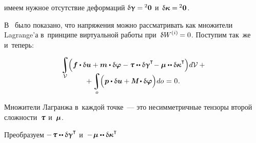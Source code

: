 \begin{otherlanguage}{russian}
\vspace{-0.56em} \noindent имеем нужное отсутствие деформаций
${\updelta\hspace{-0.1ex}\bm{\upgamma} = \hspace{-0.1ex} {^2\bm{0}}}$ и~${\updelta\hspace{-0.1ex}\bm{\kappa}\hspace{-0.1ex} = \hspace{-0.1ex} {^2\bm{0}}}$.

В~ было показано, что напряжения можно рассматривать как множители Lagrange’а в~принципе виртуальной работы при~${\variation{\internalwork} = 0}$. Поступим так~же и~теперь:

\nopagebreak\vspace{-0.33em}
\begin{multline}\label{virtualworkprinciple.1:micropolarcontinuum}
\integral\displaylimits_{\mathcal{V}} \hspace{-0.64ex} \left(^{\mathstrut} \bm{f} \dotp \variation{\fieldofdisplacements}
+ \bm{m} \dotp \variation{\fieldofrotations}
- \forcestresstensor \dotdotp \variation{\distortiontensor}^{\T} \hspace{-0.4ex}
- \couplestresstensor \dotdotp \variation{\wrynesstensor}^{\T} \hspace{-0.05ex} \right) \hspace{-0.32ex} d\mathcal{V} \hspace{.5ex} + \\[-1.1em]
+ \integral\displaylimits_o \hspace{-0.64ex} \left(^{\mathstrut} \bm{p} \dotp \variation{\fieldofdisplacements}
+ \mathboldM \hspace{-0.1ex} \dotp \variation{\fieldofrotations} \right) \hspace{-0.32ex} do \hspace{0.12ex} = \hspace{0.1ex} 0 \hspace{0.1ex}.
\end{multline}

\vspace{-0.2em} \noindent Множители Лагранжа в~каждой точке~--- это несимметричные тензоры второй сложности~$\forcestresstensor$ и~$\bm{\mu}$.

Преобразуем ${- \hspace{.2ex} \forcestresstensor \dotdotp \variation{\distortiontensor}^{\T}}$ и~${- \hspace{.2ex} \couplestresstensor \dotdotp \variation{\wrynesstensor}^{\T}}$


\end{otherlanguage}

